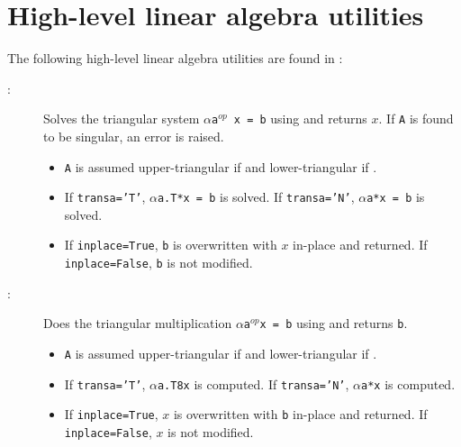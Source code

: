 \documentclass[]{manual}
\begin{document}
\section{High-level linear algebra utilities}
The following high-level linear algebra utilities are found in :
\begin{description}

    \item[:] Solves the triangular system \texttt{$\alpha$a$^{op}$ x = b} using  and returns $x$. If \texttt{A} is found to be singular, an error is raised.
    \begin{itemize}
        \item \texttt{A} is assumed upper-triangular if  and lower-triangular if .
        \item If \texttt{transa='T'}, \texttt{$\alpha$a.T*x = b} is solved. If \texttt{transa='N'}, \texttt{$\alpha$a*x = b} is solved.
        \item If \texttt{inplace=True}, \texttt{b} is overwritten with $x$ in-place and returned. If \texttt{inplace=False}, \texttt{b} is not modified.
    \end{itemize}

    \item[:] Does the triangular multiplication \texttt{$\alpha$a$^{op}$x = b} using  and returns \texttt{b}.
    \begin{itemize}
        \item \texttt{A} is assumed upper-triangular if  and lower-triangular if .
        \item If \texttt{transa='T'}, \texttt{$\alpha$a.T8x} is computed. If \texttt{transa='N'}, \texttt{$\alpha$a*x} is computed.
        \item If \texttt{inplace=True}, $x$ is overwritten with \texttt{b} in-place and returned. If \texttt{inplace=False}, $x$ is not modified.
    \end{itemize}
\end{description}

\end{document}

